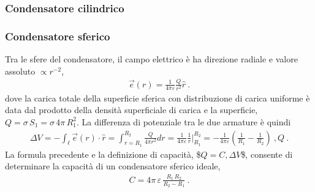 \documentclass[letterpaper,10pt,italian]{jupyterBook}
\begin{document}
\subsubsection*{Condensatore cilindrico}

\sphinxAtStartPar
{}
\subsubsection*{Condensatore sferico}

\sphinxAtStartPar
Tra le sfere del condensatore, il campo elettrico è ha direzione radiale e valore assoluto \(\propto r^{-2}\),
\begin{equation*}
\begin{split}\vec{e}(r) = \frac{1}{4 \pi \varepsilon} \frac{Q}{r^2} \hat{r} \ .\end{split}
\end{equation*}
\sphinxAtStartPar
dove la carica totale della superficie sferica con distribuzione di carica uniforme è data dal prodotto della densità superficiale di carica e la superficie, \(Q = \sigma \, S_1 = \sigma \, 4 \pi \, R_1^2\).
La differenza di potenziale tra le due armature è quindi
\begin{equation*}
\begin{split}\Delta V = - \int_{\ell} \vec{e}(r) \cdot \hat{r} = \int_{r=R_1}^{R_2} \frac{Q}{4 \pi r^2} dr = \frac{1}{4 \pi \varepsilon} \frac{1}{r} \bigg|_{R_1}^{R_2} = - \frac{1}{4 \pi \varepsilon} \left(\frac{1}{R_1} - \frac{1}{R_2} \right) \ , Q \ .\end{split}
\end{equation*}
\sphinxAtStartPar
La formula precedente e la definizione di capacità, \$\(Q = C , \Delta V\)\$, consente di determinare la capacità di un condensatore sferico ideale,
\begin{equation*}
\begin{split}C = 4 \pi \, \varepsilon \,  \frac{R_1 \, R_2}{R_2 - R_1} \ .\end{split}
\end{equation*}


\sphinxstepscope
\end{document}

